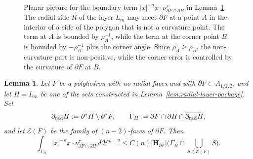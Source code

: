 \documentclass[reqno,11pt]{amsart}
\makeatletter
\newcommand{\HH}{\mathscr H}
\newtheorem{lem}[thm]{Lemma}%
\numberwithin{equation}{section}
\theoremstyle{remark}
\makeatother
\begin{document}
\begin{figure}[h]
\centering
{}
\caption{Planar picture for the boundary term
$|x|^{-n}x\cdot\nu^\tau_{\partial F\cap\partial H}$ in Lemma~\ref{lem:polyhedral-edge}. The radial side $R$ of
the layer $L_m$ may meet $\partial F$ at a point $A$ in the interior of a side
of the polygon that is not a curvature point. The term at $A$ is bounded by $\rho_A^{-1}$, while
the term at the corner point $B$ is bounded by $-\rho_B^{-1}$ plus the corner
angle. Since $\rho_A\ge\rho_B$, the non-curvature part is non-positive, while
the corner error is controlled by the curvature of $\partial F$ at $B$.}
\end{figure}

\begin{lem}\label{lem:polyhedral-edge}
Let $F$ be a polyhedron with no radial faces and with
$\partial F\subset A_{1/2,2}$, and let $H=L_m$ be one of the sets constructed in
Lemma~\ref{lem:radial-layer-package}.
Set
\[
\partial_{\rm rad}H:=\partial^*H\setminus\partial^*F,
\qquad
\Gamma_H:=\partial F\cap\partial H\cap
\overline{\partial_{\rm rad}H},
\]
and let $\mathcal E(F)$ be the family of $(n-2)$-faces of $\partial F$.
Then
\[
\int_{\Gamma_H}|x|^{-n}x\cdot\nu^\tau_{\partial F\cap\partial H}\,
d\HH^{n-2}
\le
C(n)|\mathbf H_{\partial F}|\bigg(\Gamma_H\cap
\bigcup_{S\in\mathcal E(F)}S\bigg).
\]
\end{lem}
\end{document}
